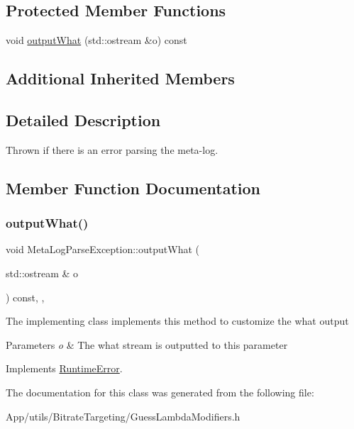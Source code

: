 \subsection*{Protected Member Functions}
\begin{DoxyCompactItemize}
\item 
void \hyperlink{class_meta_log_parse_exception_a18d40347b5a6eeef08b2c0d51a248898}{output\+What} (std\+::ostream \&o) const
\end{DoxyCompactItemize}
\subsection*{Additional Inherited Members}


\subsection{Detailed Description}
Thrown if there is an error parsing the meta-\/log. 

\subsection{Member Function Documentation}
\mbox{\label{class_meta_log_parse_exception_a18d40347b5a6eeef08b2c0d51a248898}} 
\subsubsection{\texorpdfstring{output\+What()}{outputWhat()}}
{\footnotesize\ttfamily void Meta\+Log\+Parse\+Exception\+::output\+What (\begin{DoxyParamCaption}\item[{std\+::ostream \&}]{o }\end{DoxyParamCaption}) const\hspace{0.3cm}{\ttfamily [inline]}, {\ttfamily [protected]}, {\ttfamily [virtual]}}

The implementing class implements this method to customize the what output 
\begin{DoxyParams}{Parameters}
{\em o} & The what stream is outputted to this parameter \\
\hline
\end{DoxyParams}


Implements \hyperlink{class_runtime_error_a5020b04a2a7fac8b1dbfbfe4a30055b0}{Runtime\+Error}.



The documentation for this class was generated from the following file\+:\begin{DoxyCompactItemize}
\item 
App/utils/\+Bitrate\+Targeting/Guess\+Lambda\+Modifiers.\+h\end{DoxyCompactItemize}

